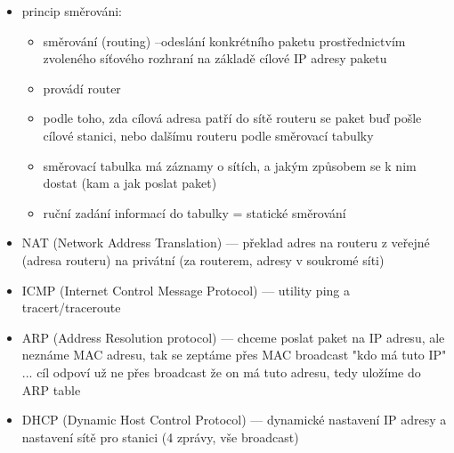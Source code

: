 \begin{itemize}
	\item princip směrováni:
	\begin{itemize}
		\item směrování (routing) --odeslání konkrétního paketu prostřednictvím zvoleného síťového rozhraní na základě cílové IP adresy paketu
		\item provádí router
		\item podle toho, zda cílová adresa patří do sítě routeru se paket buď pošle cílové stanici, nebo dalšímu routeru podle směrovací tabulky
		\item směrovací tabulka má záznamy o sítích, a jakým způsobem se k nim dostat (kam a jak poslat paket)
		\item ruční zadání informací do tabulky = statické směrování
	\end{itemize}
	\item NAT (Network Address Translation) --- překlad adres na routeru z veřejné (adresa routeru) na privátní (za routerem, adresy v soukromé síti)
	\item ICMP (Internet Control Message Protocol) --- utility ping a tracert/traceroute
	\item ARP (Address Resolution protocol) --- chceme poslat paket na IP adresu, ale neznáme MAC adresu, tak se zeptáme přes MAC broadcast "kdo má tuto IP" ... cíl odpoví už ne přes broadcast že on má tuto adresu, tedy uložíme do ARP table
	\item DHCP (Dynamic Host Control Protocol) --- dynamické nastavení IP adresy a nastavení sítě pro stanici (4 zprávy, vše broadcast)
\end{itemize}


